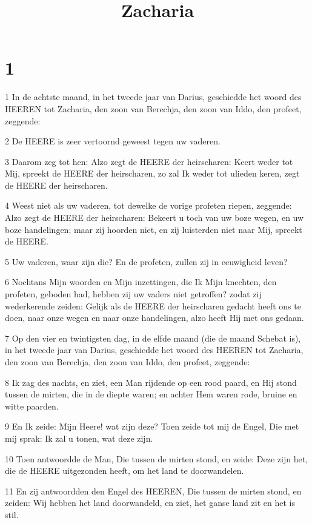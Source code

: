 

\title{Zacharia}



\chapter{1}

\par 1 In de achtste maand, in het tweede jaar van Darius, geschiedde het woord des HEEREN tot Zacharia, den zoon van Berechja, den zoon van Iddo, den profeet, zeggende:
\par 2 De HEERE is zeer vertoornd geweest tegen uw vaderen.
\par 3 Daarom zeg tot hen: Alzo zegt de HEERE der heirscharen: Keert weder tot Mij, spreekt de HEERE der heirscharen, zo zal Ik weder tot ulieden keren, zegt de HEERE der heirscharen.
\par 4 Weest niet als uw vaderen, tot dewelke de vorige profeten riepen, zeggende: Alzo zegt de HEERE der heirscharen: Bekeert u toch van uw boze wegen, en uw boze handelingen; maar zij hoorden niet, en zij luisterden niet naar Mij, spreekt de HEERE.
\par 5 Uw vaderen, waar zijn die? En de profeten, zullen zij in eeuwigheid leven?
\par 6 Nochtans Mijn woorden en Mijn inzettingen, die Ik Mijn knechten, den profeten, geboden had, hebben zij uw vaders niet getroffen? zodat zij wederkerende zeiden: Gelijk als de HEERE der heirscharen gedacht heeft ons te doen, naar onze wegen en naar onze handelingen, alzo heeft Hij met ons gedaan.
\par 7 Op den vier en twintigsten dag, in de elfde maand (die de maand Schebat is), in het tweede jaar van Darius, geschiedde het woord des HEEREN tot Zacharia, den zoon van Berechja, den zoon van Iddo, den profeet, zeggende:
\par 8 Ik zag des nachts, en ziet, een Man rijdende op een rood paard, en Hij stond tussen de mirten, die in de diepte waren; en achter Hem waren rode, bruine en witte paarden.
\par 9 En Ik zeide: Mijn Heere! wat zijn deze? Toen zeide tot mij de Engel, Die met mij sprak: Ik zal u tonen, wat deze zijn.
\par 10 Toen antwoordde de Man, Die tussen de mirten stond, en zeide: Deze zijn het, die de HEERE uitgezonden heeft, om het land te doorwandelen.
\par 11 En zij antwoordden den Engel des HEEREN, Die tussen de mirten stond, en zeiden: Wij hebben het land doorwandeld, en ziet, het ganse land zit en het is stil.
